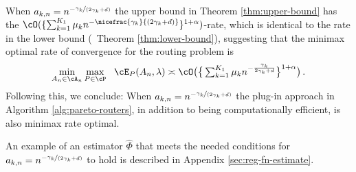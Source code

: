 \begin{remark} \label{cor:efficient-routers}
    When $a_{k, n} = n^{-\nicefrac{\gamma_k}{(2\gamma_k +d)}}$ the upper bound in Theorem \ref{thm:upper-bound} has the $\cO(\{\sum_{k = 1}^{K_1}\mu_k n^{-\nicefrac{\gamma_k}{(2\gamma_k+d)}}\}^{1+\alpha})$-rate, which is identical to the rate in the lower bound (\cf\ Theorem \ref{thm:lower-bound}), suggesting that the minimax optimal rate of convergence for the routing problem is 
\begin{equation}
    \label{eq:minimax-rate}
     \textstyle  \min\limits_{A_n \in \cA_n} \max\limits_{P \in \cP} ~~ \cE_P(A_n, \lambda) \asymp \textstyle  \cO\big ( \big \{\sum_{k = 1}^{K_1} \mu_k n^{- \frac{\gamma_k}{2\gamma_k + d}}\big\}^{1+\alpha}\big ) \,.
\end{equation}
   Following this, we conclude: When $a_{k, n} = n^{-\nicefrac{\gamma_k}{(2\gamma_k +d)}}$ the plug-in approach in Algorithm \ref{alg:pareto-routers}, in addition to being computationally efficient, is also minimax rate optimal. 
\end{remark} 
An example of an estimator $\hat{\Phi}$ that meets the needed conditions for $a_{k, n} = n^{-\nicefrac{\gamma_k}{(2\gamma_k +d)}}$ to hold is described in Appendix \ref{sec:reg-fn-estimate}. 
    
